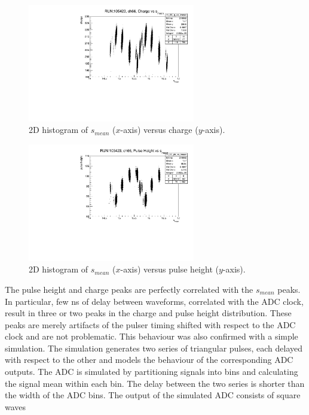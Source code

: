 \begin{figure}[!h]
  \centering
  \includegraphics[width=0.65\textwidth]{figures/pdf/chtmean.pdf}
  \caption{2D histogram of $s_{mean}$ ($x$-axis) versus charge ($y$-axis).}
  \label{fig:chtm}
\end{figure}
\begin{figure}[!h]
  \centering
  \includegraphics[width=0.65\textwidth]{figures/pdf/phtmean1.pdf}
  \caption{2D histogram of $s_{mean}$ ($x$-axis) versus pulse height ($y$-axis).}
  \label{fig:phtm}
\end{figure}
The pulse height and charge peaks are perfectly correlated with the $s_{mean}$ peaks. 
In particular, few ns of delay between waveforms, correlated with the ADC clock, 
result in three or two peaks in the charge and pulse height distribution. 
These peaks are merely artifacts of the pulser timing shifted with respect to the ADC 
clock and are not problematic. This behaviour was also confirmed with a simple simulation.
The simulation generates two series of triangular pulses, each delayed with respect to the other and models the behaviour 
of the corresponding ADC outputs. The ADC is simulated by partitioning signals into bins and calculating the signal mean within each bin. 
The delay between the two series is shorter than the width of the ADC bins. The output of the simulated ADC consists of square waves 

